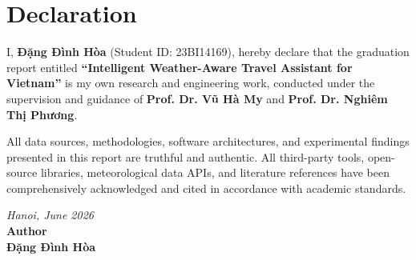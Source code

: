 \chapter*{Declaration}

I, \textbf{Đặng Đình Hòa} (Student ID: 23BI14169), hereby declare that the graduation report entitled \textbf{“Intelligent Weather-Aware Travel Assistant for Vietnam”} is my own research and engineering work, conducted under the supervision and guidance of \textbf{Prof. Dr. Vũ Hà My} and \textbf{Prof. Dr. Nghiêm Thị Phương}.

All data sources, methodologies, software architectures, and experimental findings presented in this report are truthful and authentic. All third-party tools, open-source libraries, meteorological data APIs, and literature references have been comprehensively acknowledged and cited in accordance with academic standards.

\vspace{15mm}
\begin{flushright}
\textit{Hanoi, June 2026}\\[3mm]
\textbf{Author}\\[15mm]
\textbf{Đặng Đình Hòa}
\end{flushright}

